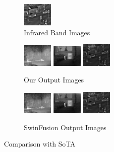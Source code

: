 \begin{figure}[htbp]
\begin{subfigure}[b]{\textwidth}
        \includegraphics[width=0.16\textwidth, height=0.1\textheight]{imgs/ch5/ir/02.png}
        \captionsetup{justification=raggedright,singlelinecheck=false}
        \caption{Infrared Band Images}
        \label{fig:ch5:met9:ir}
    \end{subfigure}
    \vspace{0.01cm}
    \begin{subfigure}[b]{\textwidth}
        \includegraphics[width=0.16\textwidth, height=0.1\textheight]{imgs/ch5/ours/20.jpg}
        \includegraphics[width=0.16\textwidth, height=0.1\textheight]{imgs/ch5/ours/12.jpg}
        \includegraphics[width=0.16\textwidth, height=0.1\textheight]{imgs/ch5/ours/02.jpg}
        \captionsetup{justification=raggedright,singlelinecheck=false}
        \caption{Our Output Images}
        \label{fig:ch5:met9:ours}
    \end{subfigure}
    \vspace{0.01cm}
    \begin{subfigure}[b]{\textwidth}
        \includegraphics[width=0.16\textwidth, height=0.1\textheight]{imgs/ch5/swinFusion/20.jpg}
        \includegraphics[width=0.16\textwidth, height=0.1\textheight]{imgs/ch5/swinFusion/12.jpg}
        \includegraphics[width=0.16\textwidth, height=0.1\textheight]{imgs/ch5/swinFusion/02.jpg}
        \captionsetup{justification=raggedright,singlelinecheck=false}
        \caption{SwinFusion\cite{ma2022swinfusion} Output Images}
        \label{fig:ch5:met9:swin}
    \end{subfigure}
    \captionsetup{justification=raggedright,singlelinecheck=false}
        \caption{Comparison with SoTA}
    \label{fig:ch5:met4}
\end{figure}

